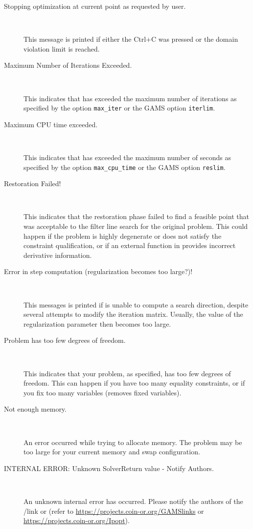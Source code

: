 \begin{description}
\item[Stopping optimization at current point as requested by user.] ~

    This message is printed if either the Ctrl+C was pressed or the domain violation limit is reached.

\item[Maximum Number of Iterations Exceeded.] ~

    This indicates that \IPOPT has exceeded the maximum number of iterations as specified by the \IPOPT option \texttt{max\_iter} or the GAMS option \texttt{iterlim}.

\item[Maximum CPU time exceeded.] ~

    This indicates that \IPOPT has exceeded the maximum number of seconds as specified by the \IPOPT option \texttt{max\_cpu\_time} or the GAMS option \texttt{reslim}.

\item[Restoration Failed!] ~

    This indicates that the restoration phase failed to find a feasible point that was acceptable to the filter line search for the original problem.
    This could happen if the problem is highly degenerate or does not satisfy the constraint qualification, or if an external function in \GAMS provides incorrect derivative information.

\item[Error in step computation (regularization becomes too large?)!] ~

    This messages is printed if \IPOPT is unable to compute a search direction, despite several attempts to modify the iteration matrix.
    Usually, the value of the regularization parameter then becomes too large.

\item[Problem has too few degrees of freedom.] ~

    This indicates that your problem, as specified, has too few degrees of freedom.
    This can happen if you have too many equality constraints, or if you fix too many variables (\IPOPT removes fixed variables).

\item[Not enough memory.] ~

    An error occurred while trying to allocate memory.
    The problem may be too large for your current memory and swap configuration.

\item[INTERNAL ERROR: Unknown SolverReturn value - Notify \IPOPT Authors.] ~

    An unknown internal error has occurred. Please notify the authors of the \GAMS/\IPOPT link or \IPOPT (refer to \url{https://projects.coin-or.org/GAMSlinks} or \url{https://projects.coin-or.org/Ipopt}).
\end{description}


